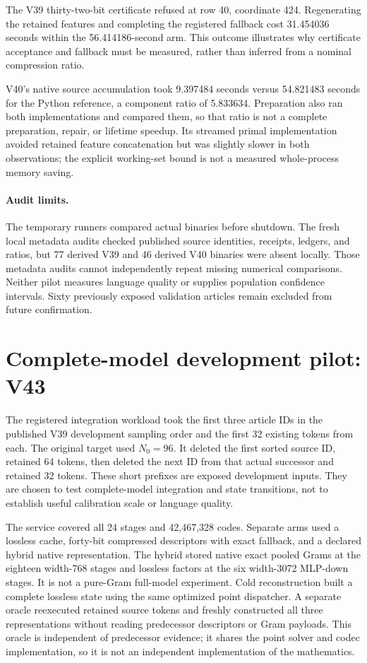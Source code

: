\documentclass[10pt,twocolumn,letterpaper]{article}
\begin{document}
The V39 thirty-two-bit certificate refused at row 40, coordinate 424. Regenerating
the retained features and completing the registered fallback cost 31.454036
seconds within the 56.414186-second arm. This outcome illustrates why certificate
acceptance and fallback must be measured, rather than inferred from a nominal
compression ratio.

V40's native source accumulation took 9.397484 seconds versus 54.821483 seconds
for the Python reference, a component ratio of 5.833634. Preparation also ran both
implementations and compared them, so that ratio is not a complete preparation,
repair, or lifetime speedup. Its streamed primal implementation avoided retained
feature concatenation but was slightly slower in both observations; the explicit
working-set bound is not a measured whole-process memory saving.

\paragraph{Audit limits.}
The temporary runners compared actual binaries before shutdown. The fresh local
metadata audits checked published source identities, receipts, ledgers, and
ratios, but 77 derived V39 and 46 derived V40 binaries were absent locally. Those
metadata audits cannot independently repeat missing numerical comparisons.
Neither pilot measures language quality or supplies population confidence
intervals. Sixty previously exposed validation articles remain excluded from
future confirmation.

\section{Complete-model development pilot: V43}
\label{sec:v43}
The registered integration workload took the first three article IDs in the
published V39 development sampling order and the first 32 existing tokens from
each. The original target used $N_0=96$. It deleted the first sorted source ID,
retained 64 tokens, then deleted the next ID from that actual successor and retained
32 tokens. These short prefixes are exposed development inputs. They are chosen
to test complete-model integration and state transitions, not to establish useful
calibration scale or language quality.

The service covered all 24 stages and 42,467,328 codes. Separate arms used a lossless
cache, forty-bit compressed descriptors with exact fallback, and a declared hybrid
native representation. The hybrid stored native exact pooled Grams at the eighteen
width-768 stages and lossless factors at the six width-3072 MLP-down stages. It is
not a pure-Gram full-model experiment. Cold reconstruction built a complete
lossless state using the same optimized point dispatcher. A separate oracle
reexecuted retained source tokens and freshly constructed all three representations
without reading predecessor descriptors or Gram payloads. This oracle is
independent of predecessor evidence; it shares the point solver and codec
implementation, so it is not an independent implementation of the mathematics.
\end{document}
